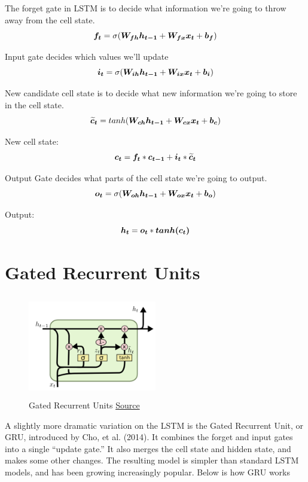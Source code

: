 The forget gate in LSTM is to decide what information we’re going to throw away from the cell state.
\[\vect{f_t} = \sigma(\matr{W_{fh}}\vect{h_{t-1}}+\matr{W_{fx}}\vect{x_t} + \vect{b_f}) \]

Input gate decides which values we’ll update
\[\vect{i_t} = \sigma(\matr{W_{ih}}\vect{h_{t-1}} + \matr{W_{ix}}\vect{x_t} + \vect{b_i})\]

New candidate cell state is to decide what new information we’re going to store in the cell state.
\[\vect{\widetilde{c}_t} = tanh(\matr{W_{ch}}\vect{h_{t-1}} + \matr{W_{cx}}\vect{x_t} + \vect{b_c})\]

New cell state:
\[\vect{c_t} = \vect{f_t}*\vect{c_{t-1}} + \vect{i_t}*\vect{\widetilde{c}_t}\]

Output Gate decides what parts of the cell state we’re going to output.
\[\vect{o_t} = \sigma(\matr{W_{oh}}\vect{h_{t-1}} + \matr{W_{ox}}\vect{x_t} + \vect{b_o})\]

Output:
\[\vect{h_t} = \vect{o_t}*\vect{tanh(c_t)}\]

\section{Gated Recurrent Units}

\begin{figure}[h]
  \centering
      \includegraphics[width=0.5\textwidth,height=4.5cm]{lectures/06-b-rnn/image/GRU.png}
          \caption{
            Gated Recurrent Units
            \href{http://colah.github.io/posts/2015-08-Understanding-LSTMs/}{Source}
          }
          \label{fig:lstm}
\end{figure}

A slightly more dramatic variation on the LSTM is the Gated Recurrent Unit, or GRU, introduced by Cho, et al. (2014).
It combines the forget and input gates into a single “update gate.” It also merges the cell state and hidden state, and makes some other changes. 
The resulting model is simpler than standard LSTM models, and has been growing increasingly popular.
Below is how GRU works

